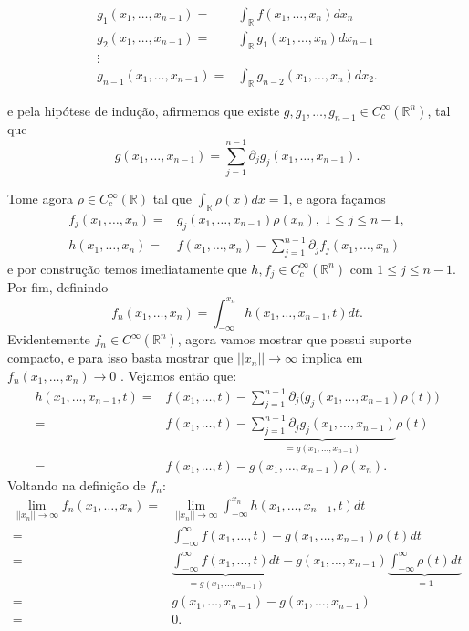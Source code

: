 \documentclass{article}
\begin{document}
	$$
	\begin{aligned}
	g_{1}(x_{1}, \dots, x_{n-1}) 
	=& \int_{\mathbb{R}} f(x_{1}, \dots, x_{n})dx_{n}
	\\
	g_{2}(x_{1}, \dots, x_{n-1}) 
	=& \int_{\mathbb{R}} g_{1}(x_{1}, \dots, x_{n})dx_{n-1}
	\\
	\vdots &
	\\
	g_{n-1}(x_{1}, \dots, x_{n-1})
	=& \int_{\mathbb{R}} g_{n-2}(x_{1}, \dots, x_{n})dx_{2}.
	\end{aligned}
	$$
	
	e pela hipótese de indução, afirmemos que existe $g, g_{1}, \dots, g_{n-1} \in C^{\infty}_{c}(\mathbb{R}^{n})$, tal que
	$$
	g(x_{1}, \dots, x_{n-1}) = \sum_{j=1}^{n-1} \partial_{j}g_{j}(x_{1}, \dots, x_{n-1}).
	$$
	
	Tome agora $\rho \in C^{\infty}_{c}(\mathbb{R})$ tal que $\int_{\mathbb{R}} \rho(x)dx = 1$, e agora façamos 
	$$
	\begin{aligned}
	f_{j}(x_{1}, \dots, x_{n}) =& g_{j}(x_{1}, \dots, x_{n-1})\rho(x_{n}), \; 1 \leq j \leq n-1,
	\\
	h(x_{1}, \dots, x_{n}) =& f(x_{1}, \dots, x_{n}) - \sum_{j=1}^{n-1} \partial_{j}f_{j}(x_{1}, \dots, x_{n})
	\end{aligned}
	$$
	e por construção temos imediatamente que $h, f_{j} \in C^{\infty}_{c}(\mathbb{R}^{n})$ com $1 \leq j \leq n-1$. Por fim, definindo
	$$
	f_{n}(x_{1}, \dots, x_{n}) = \int_{-\infty}^{x_{n}}h(x_{1}, \dots, x_{n-1}, t)dt.
	$$
	Evidentemente $f_{n} \in C^{\infty}(\mathbb{R}^{n})$, agora vamos mostrar que possui suporte compacto, e para isso basta mostrar que $||x_{n}|| \to \infty$ implica em $f_{n}(x_{1}, \dots, x_{n}) \to 0$ . Vejamos então que:
	$$
	\begin{aligned}
	h(x_{1}, \dots, x_{n-1}, t) =& f(x_{1}, \dots, t) - \sum_{j=1}^{n-1} \partial_{j} \Big(g_{j}(x_{1}, \dots, x_{n-1})\rho(t) \Big)
	\\
	=& f(x_{1}, \dots, t) - \underbrace{ \sum_{j=1}^{n-1} \partial_{j} g_{j}(x_{1}, \dots, x_{n-1}) }_{ =g(x_{1}, \dots, x_{n-1})}\rho(t)
	\\
	=& f(x_{1}, \dots, t) - g(x_{1}, \dots, x_{n-1})\rho(x_{n}).
	\end{aligned}
	$$
	Voltando na definição de $f_{n}$:
	$$
	\begin{aligned}
	\lim_{||x_{n}|| \to \infty} f_{n}(x_{1}, \dots, x_{n}) 
	=& \lim_{||x_{n}|| \to \infty} \int_{-\infty}^{x_{n}}h(x_{1}, \dots, x_{n-1}, t)dt
	\\
	=& \int_{-\infty}^{\infty}f(x_{1}, \dots, t) - g(x_{1}, \dots, x_{n-1})\rho(t)dt
	\\
	=& \underbrace{ \int_{-\infty}^{\infty}f(x_{1}, \dots, t)dt }_{= g(x_{1}, \dots, x_{n-1})} - g(x_{1}, \dots, x_{n-1}) \underbrace{ \int_{-\infty}^{\infty}\rho(t)dt }_{=1}
	\\
	=& g(x_{1}, \dots, x_{n-1}) - g(x_{1}, \dots, x_{n-1})
	\\
	=&0.
	\end{aligned}
	$$	
\end{document}
